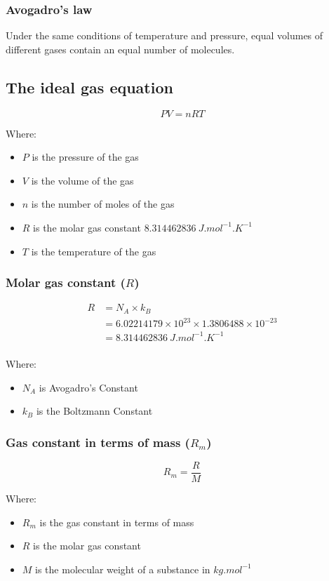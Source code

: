 \documentclass[11pt]{article}
\begin{document}
\subsubsection{Avogadro's law}
\label{sec:org78547dc}
Under the same conditions of temperature and pressure, equal volumes of different gases contain an equal number of molecules.
\subsection{The ideal gas equation}
\label{sec:orgb4a1394}
\[PV = nRT\]

Where:
\begin{itemize}
\item \(P\) is the pressure of the gas
\item \(V\) is the volume of the gas
\item \(n\) is the number of moles of the gas
\item \(R\) is the molar gas constant \(\qty{8.314462836}{J.mol^{-1}.K^{-1}}\)
\item \(T\) is the temperature of the gas
\end{itemize}
\subsubsection{Molar gas constant (\(R\))}
\label{sec:orgcb1efd7}
\begin{align*}
R &= N_A \times k_B \\
&= 6.02214179 \times 10^{23} \times 1.3806488 \times 10^{-23} \\
&= \qty{8.314462836}{J.mol^{-1}.K^{-1}} \\
\end{align*}

Where:
\begin{itemize}
\item \(N_A\) is Avogadro's Constant
\item \(k_B\) is the Boltzmann Constant
\end{itemize}
\subsubsection{Gas constant in terms of mass (\(R_m\))}
\label{sec:orgb216b39}
\[R_m = \frac{R}{M}\]

Where:
\begin{itemize}
\item \(R_m\) is the gas constant in terms of mass
\item \(R\) is the molar gas constant
\item \(M\) is the molecular weight of a substance in \(\unit{kg.mol^{-1}}\)
\end{itemize}
\end{document}
